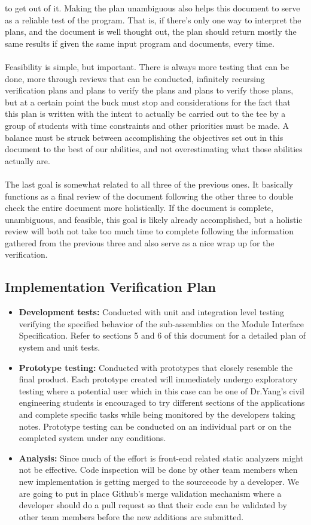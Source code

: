 \documentclass[12pt, titlepage]{article}
\begin{document}
to get out of it. Making the plan unambiguous also helps this document to serve as a reliable test of the program. That is, if there’s only one way to interpret the plans, 
and the document is well thought out, the plan should return mostly the same results if given the same input program and documents, every time.\\\\
Feasibility is simple, but important. There is always more testing that can be done, more through reviews that can be conducted, infinitely recursing verification plans
and plans to verify the plans and plans to verify those plans, but at a certain point the buck must stop and considerations for the fact that this plan is written
with the intent to actually be carried out to the tee by a group of students with time constraints and other priorities must be made. A balance must be struck between
accomplishing the objectives set out in this document to the best of our abilities, and not overestimating what those abilities actually are.\\\\ The last goal is somewhat
related to all three of the previous ones. It basically functions as a final review of the document following the other three to double check the entire document more
holistically. If the document is complete, unambiguous, and feasible, this goal is likely already accomplished, but a holistic review will both not take too much time to
complete following the information gathered from the previous three and also serve as a nice wrap up for the verification.

\subsection{Implementation Verification Plan}
\begin{itemize}
  \item\textbf{Development tests:} Conducted with unit and integration level testing verifying the specified behavior of the sub-assemblies on the Module Interface Specification. Refer to sections 5 and 6 of this document for a detailed plan of system and unit tests.
  \item\textbf{Prototype testing:} Conducted with prototypes that closely resemble the final product. Each prototype created will immediately undergo exploratory testing where a potential user which in this case can be one of Dr.Yang’s civil engineering students is encouraged to try different sections of the applications and complete specific tasks while being monitored by the developers taking notes. Prototype testing can be conducted on an individual part or on the completed system under any conditions.
  \item\textbf{Analysis:} Since much of the effort is front-end related static analyzers might not be effective. Code inspection will be done by other team members when new implementation is getting merged to the sourcecode by a developer. We are going to put in place Github’s merge validation mechanism where a developer should do a pull request so that their code can be validated by other team members before the new additions are submitted.
  
\end{itemize}
\end{document}
